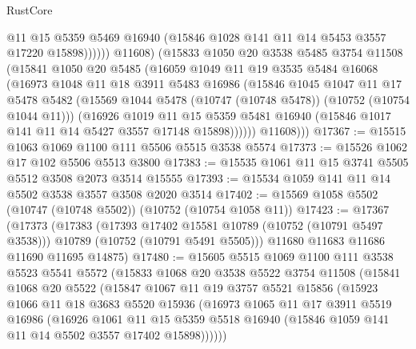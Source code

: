 \begin{lexlean}{RustCore}
\begin{coremodule}
                    @11
                    @15
                    @5359
                    @5469
                    @16940
                    (@15846 @1028 @141 @11 @14 @5453 @3557 @17220 @15898))))))
          @11608)
        (@15833
          @1050
          @20
          @3538
          @5485
          @3754
          @11508
          (@15841
            @1050
            @20
            @5485
            (@16059
              @1049
              @11
              @19
              @3535
              @5484
              @16068
              (@16973
                @1048
                @11
                @18
                @3911
                @5483
                @16986
                (@15846
                  @1045
                  @1047
                  @11
                  @17
                  @5478
                  @5482
                  (@15569 @1044 @5478 (@10747 (@10748 @5478)) (@10752 (@10754 @1044 @11)))
                  (@16926
                    @1019
                    @11
                    @15
                    @5359
                    @5481
                    @16940
                    (@15846 @1017 @141 @11 @14 @5427 @3557 @17148 @15898))))))
          @11608)))
@17367 := @15515 @1063 @1069 @1100 @111 @5506 @5515 @3538 @5574
@17373 := @15526 @1062 @17 @102 @5506 @5513 @3800
@17383 := @15535 @1061 @11 @15 @3741 @5505 @5512 @3508 @2073 @3514 @15555
@17393 := @15534 @1059 @141 @11 @14 @5502 @3538 @3557 @3508 @2020 @3514
@17402 := @15569 @1058 @5502 (@10747 (@10748 @5502)) (@10752 (@10754 @1058 @11))
@17423 := @17367
    (@17373
      (@17383
        (@17393 @17402 @15581 @10789 (@10752 (@10791 @5497 @3538)))
        @10789
        (@10752 (@10791 @5491 @5505)))
      @11680
      @11683
      @11686
      @11690
      @11695
      @14875)
@17480 := @15605
    @5515
    @1069
    @1100
    @111
    @3538
    @5523
    @5541
    @5572
    (@15833
      @1068
      @20
      @3538
      @5522
      @3754
      @11508
      (@15841
        @1068
        @20
        @5522
        (@15847
          @1067
          @11
          @19
          @3757
          @5521
          @15856
          (@15923
            @1066
            @11
            @18
            @3683
            @5520
            @15936
            (@16973
              @1065
              @11
              @17
              @3911
              @5519
              @16986
              (@16926
                @1061
                @11
                @15
                @5359
                @5518
                @16940
                (@15846 @1059 @141 @11 @14 @5502 @3557 @17402 @15898))))))

\end{coremodule}
\end{lexlean}
